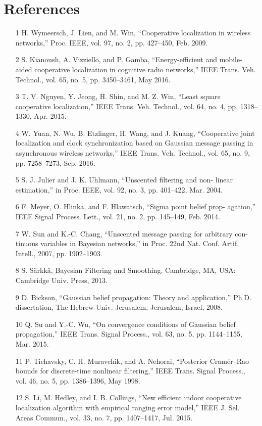 \documentclass[12pt]{article}
\begin{document}
\section{References}
	\begin{itemize}
		\item[1] H. Wymeersch, J. Lien, and M. Win, “Cooperative localization in wireless
networks,” Proc. IEEE, vol. 97, no. 2, pp. 427–450, Feb. 2009.
		\item[2] S. Kianoush, A. Vizziello, and P. Gamba, “Energy-efficient and mobile-
aided cooperative localization in cognitive radio networks,” IEEE Trans.
Veh. Technol., vol. 65, no. 5, pp. 3450–3461, May 2016.
		\item[3] T. V. Nguyen, Y. Jeong, H. Shin, and M. Z. Win, “Least square cooperative
localization,” IEEE Trans. Veh. Technol., vol. 64, no. 4, pp. 1318–1330,
Apr. 2015.
		\item[4] W. Yuan, N. Wu, B. Etzlinger, H. Wang, and J. Kuang, “Cooperative
joint localization and clock synchronization based on Gaussian message
passing in asynchronous wireless networks,” IEEE Trans. Veh. Technol.,
vol. 65, no. 9, pp. 7258–7273, Sep. 2016.
		\item[5] S. J. Julier and J. K. Uhlmann, “Unscented filtering and non-
linear estimation,” in Proc. IEEE, vol. 92, no. 3, pp. 401–422,
Mar. 2004.
		\item[6] F. Meyer, O. Hlinka, and F. Hlawatsch, “Sigma point belief prop-
agation,” IEEE Signal Process. Lett., vol. 21, no. 2, pp. 145–149,
Feb. 2014.
		\item[7] W. Sun and K.-C. Chang, “Unscented message passing for arbitrary con-
tinuous variables in Bayesian networks,” in Proc. 22nd Nat. Conf. Artif.
Intell., 2007, pp. 1902–1903.
		\item[8] S. Särkkä, Bayesian Filtering and Smoothing. Cambridge, MA, USA:
Cambridge Univ. Press, 2013.

		\item[9] D. Bickson, “Gaussian belief propagation: Theory and application,”
Ph.D. dissertation, The Hebrew Univ. Jerusalem, Jerusalem, Israel,
2008.
		\item[10] Q. Su and Y.-C. Wu, “On convergence conditions of Gaussian belief
propagation,” IEEE Trans. Signal Process., vol. 63, no. 5, pp. 1144–1155,
Mar. 2015.			\item[11] P. Tichavsky, C. H. Muravchik, and A. Nehorai, “Posterior Cramér–Rao
bounds for discrete-time nonlinear filtering,” IEEE Trans. Signal Process.,
vol. 46, no. 5, pp. 1386–1396, May 1998.
		\item[12] S. Li, M. Hedley, and I. B. Collings, “New efficient indoor cooperative
localization algorithm with empirical ranging error model,” IEEE J. Sel.
Areas Commun., vol. 33, no. 7, pp. 1407–1417, Jul. 2015.
		
	\end{itemize}
\end{document}
